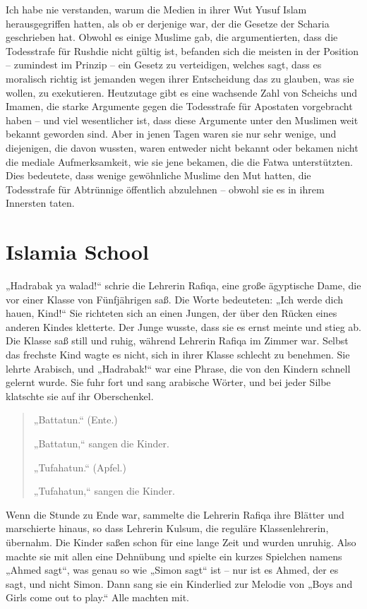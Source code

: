 \documentclass[12pt]{memoir}
\begin{document}
Ich habe nie verstanden,
warum die Medien in ihrer Wut Yusuf Islam herausgegriffen hatten,
als ob er derjenige war, der die Gesetze der Scharia geschrieben hat.
Obwohl es einige Muslime gab, die argumentierten,
dass die Todesstrafe für Rushdie nicht gültig ist,
befanden sich die meisten in der Position –
zumindest im Prinzip – ein Gesetz zu verteidigen,
welches sagt, dass es moralisch richtig ist jemanden
wegen ihrer Entscheidung das zu glauben, was sie wollen, zu exekutieren.
Heutzutage gibt es eine wachsende Zahl von Scheichs und Imamen,
die starke Argumente gegen die Todesstrafe für Apostaten vorgebracht haben –
und viel wesentlicher ist, dass diese Argumente
unter den Muslimen weit bekannt geworden sind.
Aber in jenen Tagen waren sie nur sehr wenige, und diejenigen,
die davon wussten, waren entweder nicht bekannt
oder bekamen nicht die mediale Aufmerksamkeit,
wie sie jene bekamen, die die Fatwa unterstützten.
Dies bedeutete, dass wenige gewöhnliche Muslime den Mut hatten,
die Todesstrafe für Abtrünnige öffentlich abzulehnen –
obwohl sie es in ihrem Innersten taten.


\chapter{Islamia School}

„Hadrabak ya walad!“ schrie die Lehrerin Rafiqa,
eine große ägyptische Dame, die vor einer Klasse von Fünfjährigen saß.
Die Worte bedeuteten: „Ich werde dich hauen, Kind!“
Sie richteten sich an einen Jungen,
der über den Rücken eines anderen Kindes kletterte.
Der Junge wusste, dass sie es ernst meinte und stieg ab.
Die Klasse saß still und ruhig, während Lehrerin Rafiqa im Zimmer war.
Selbst das frechste Kind wagte es nicht,
sich in ihrer Klasse schlecht zu benehmen.
Sie lehrte Arabisch, und „Hadrabak!“
war eine Phrase, die von den Kindern schnell gelernt wurde.
Sie fuhr fort und sang arabische Wörter,
und bei jeder Silbe klatschte sie auf ihr Oberschenkel.

\begin{quote}
„Battatun.“ (Ente.)

„Battatun,“ sangen die Kinder.

„Tufahatun.“ (Apfel.)

„Tufahatun,“ sangen die Kinder.
\end{quote}

Wenn die Stunde zu Ende war,
sammelte die Lehrerin Rafiqa ihre Blätter und marschierte hinaus,
so dass Lehrerin Kulsum, die reguläre Klassenlehrerin, übernahm.
Die Kinder saßen schon für eine lange Zeit und wurden unruhig.
Also machte sie mit allen eine Dehnübung
und spielte ein kurzes Spielchen namens „Ahmed sagt“,
was genau so wie „Simon sagt“ ist –
nur ist es Ahmed, der es sagt, und nicht Simon.
Dann sang sie ein Kinderlied zur Melodie von
„Boys and Girls come out to play.“
Alle machten mit.
\end{document}

